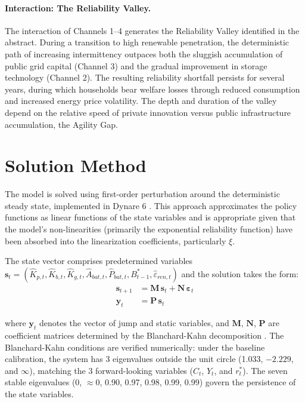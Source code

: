 \documentclass[12pt, a4paper]{article}
\begin{document}
	\paragraph{Interaction: The Reliability Valley.}
	The interaction of Channels 1--4 generates the Reliability Valley identified in the abstract. During a transition to high renewable penetration, the deterministic path of increasing intermittency outpaces both the sluggish accumulation of public grid capital (Channel 3) and the gradual improvement in storage technology (Channel 2). The resulting reliability shortfall persists for several years, during which households bear welfare losses through reduced consumption and increased energy price volatility. The depth and duration of the valley depend on the relative speed of private innovation versus public infrastructure accumulation, the Agility Gap.
	
	\section{Solution Method} \label{sec:solution}
	
	The model is solved using first-order perturbation around the deterministic steady state, implemented in Dynare 6 \citep{Adjemianetal2024}. This approach approximates the policy functions as linear functions of the state variables and is appropriate given that the model's non-linearities (primarily the exponential reliability function) have been absorbed into the linearization coefficients, particularly $\xi$.
	
	The state vector comprises predetermined variables $\mathbf{s}_t = (\hat{K}_{p,t}, \hat{K}_{b,t}, \hat{K}_{g,t}, \hat{A}_{bat,t}, \hat{P}_{bat,t}, B^*_{t-1}, \hat{\varepsilon}_{ren,t})$ and the solution takes the form:
	\begin{align}
		\mathbf{s}_{t+1} &= \mathbf{M} \, \mathbf{s}_t + \mathbf{N} \, \boldsymbol{\varepsilon}_t \\
		\mathbf{y}_t &= \mathbf{P} \, \mathbf{s}_t
	\end{align}
	
	where $\mathbf{y}_t$ denotes the vector of jump and static variables, and $\mathbf{M}$, $\mathbf{N}$, $\mathbf{P}$ are coefficient matrices determined by the Blanchard-Kahn decomposition \citep{blanchard1980}. The Blanchard-Kahn conditions are verified numerically: under the baseline calibration, the system has 3 eigenvalues outside the unit circle (1.033, $-2.229$, and $\infty$), matching the 3 forward-looking variables ($C_t$, $Y_t$, and $r^*_t$). The seven stable eigenvalues (0, $\approx$0, 0.90, 0.97, 0.98, 0.99, 0.99) govern the persistence of the state variables.
	
\end{document}
